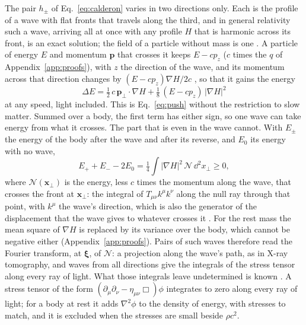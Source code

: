 The pair $h_\pm$ of Eq.~\eqref{eq:calderon} varies in two directions only. Each
is the profile of a wave with flat fronts that travels along the third, and in
general relativity such a wave, arriving all at once with any profile $H$ that
is harmonic across its front, is an exact solution; the field of a particle
without mass is one \cite{AichelburgSexl1971}. A particle of energy $E$ and
momentum $\mathbf p$ that crosses it keeps $E - cp_z$ ($c$ times the $q$ of
Appendix~\ref{app:proofs}), with $z$ the direction of the wave, and its momentum across that direction changes by
$(E - cp_z)\nabla H/2c$ \cite{Balasin1997,Steinbauer1998}, so that it
gains the energy
\begin{equation}\label{eq:shock}
\Delta E = \tfrac12\,c\,\mathbf p_\perp\cdot\nabla H
+ \tfrac18\,(E - cp_z)\,|\nabla H|^2
\end{equation}
at any speed, light included. This is Eq.~\eqref{eq:push} without the
restriction to slow matter. Summed over a body, the first term has either
sign, so one wave can take energy from what it crosses. The part that is even
in the wave cannot. With $E_\pm$ the energy of the body after the wave and
after its reverse, and $E_0$ its energy with no wave,
\begin{equation}\label{eq:shock-even}
E_+ + E_- - 2E_0 = \tfrac14\int|\nabla H|^2\,\mathcal N\,\dd^2x_\perp \ge 0 ,
\end{equation}
where $\mathcal N(\mathbf x_\perp)$ is the energy, less $c$ times the momentum along
the wave, that crosses the front at $\mathbf x_\perp$: the integral of
$T_{\mu\nu}k^\mu k^\nu$ along the null ray through that point, with $k^\mu$
the wave's direction, which is also the generator of the displacement that
the wave gives to whatever crosses it
\cite{CasiniTesteTorroba2017,CordovaShao2018}. For the rest mass the mean
square of $\nabla H$ is replaced by its variance over the body, which cannot
be negative either (Appendix~\ref{app:proofs}). Pairs of such waves therefore read the Fourier
transform, at $\boldsymbol\xi$, of $\mathcal N$: a projection along the wave's path, as
in X-ray tomography, and waves from all directions give the integrals of the
stress tensor along every ray of light. What those integrals leave
undetermined is known \cite{KrishnanSenapatiVashisth2020}. A stress tensor of
the form $(\partial_\mu\partial_\nu - \eta_{\mu\nu}\Box)\phi$ integrates to zero
along every ray of light; for a
body at rest it adds $\nabla^2\phi$ to the density of energy, with stresses to
match, and it is excluded when the stresses are small beside $\rho c^2$.
